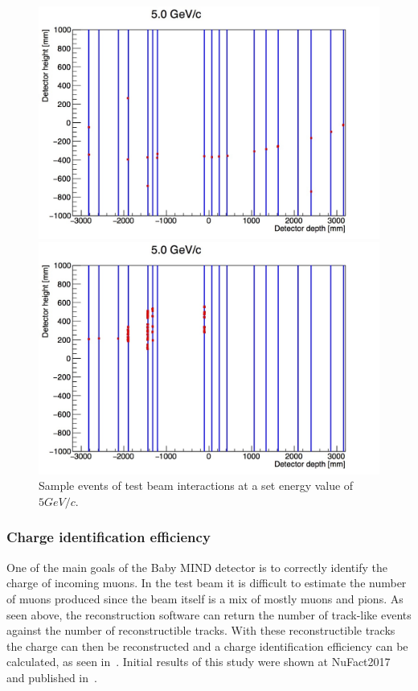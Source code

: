 \begin{figure}[h!]
\centering
\includegraphics[width=\textwidth]{figures/oldStudies/m5GeVevent2.jpg}

\includegraphics[width=\textwidth]{figures/oldStudies/m5GeVevent3.jpg}
\caption{Sample events of test beam interactions at a set energy value of $5GeV/c$.}
\label{fig:EventsInitial}
\end{figure}

\subsubsection{Charge identification efficiency}
One of the main goals of the Baby MIND detector is to correctly identify the charge of incoming muons. In the test beam it is difficult to estimate the number of muons produced since the beam itself is a mix of mostly muons and pions. As seen above, the reconstruction software can return the number of track-like events against the number of reconstructible tracks. With these reconstructible tracks the charge can then be reconstructed and a charge identification efficiency can be calculated, as seen in~. Initial results of this study were shown at NuFact2017 and published in~\cite{82Uppsala}.


